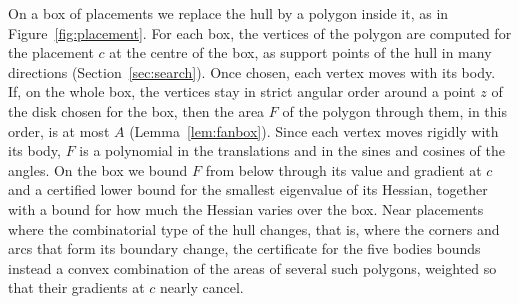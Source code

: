 \documentclass[11pt]{amsart}
\theoremstyle{definition}
\theoremstyle{remark}
\numberwithin{equation}{section}
\begin{document}
On a box of placements we replace the hull by a polygon inside it, as in Figure~\ref{fig:placement}. For each box, the vertices of the polygon are computed for the placement $c$ at the centre of the box, as support points of the hull in many directions (Section~\ref{sec:search}). Once chosen, each vertex moves with its body. If, on the whole box, the vertices stay in strict angular order around a point $z$ of the disk chosen for the box, then the area $F$ of the polygon through them, in this order, is at most $A$ (Lemma~\ref{lem:fanbox}). Since each vertex moves rigidly with its body, $F$ is a polynomial in the translations and in the sines and cosines of the angles. On the box we bound $F$ from below through its value and gradient at $c$ and a certified lower bound for the smallest eigenvalue of its Hessian, together with a bound for how much the Hessian varies over the box. Near placements where the combinatorial type of the hull changes, that is, where the corners and arcs that form its boundary change, the certificate for the five bodies bounds instead a convex combination of the areas of several such polygons, weighted so that their gradients at $c$ nearly cancel.
\end{document}
